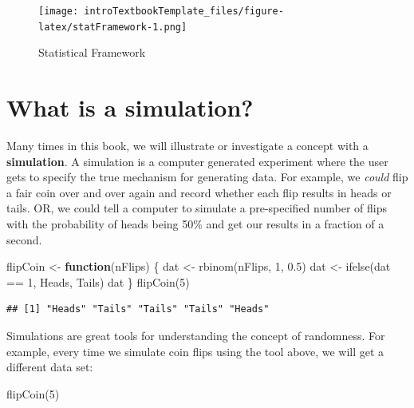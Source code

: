\documentclass[
]{book}
\newenvironment{Shaded}{\begin{snugshade}}{\end{snugshade}}
\newcommand{\ControlFlowTok}[1]{\textcolor[rgb]{0.13,0.29,0.53}{\textbf{#1}}}
\newcommand{\DecValTok}[1]{\textcolor[rgb]{0.00,0.00,0.81}{#1}}
\newcommand{\FloatTok}[1]{\textcolor[rgb]{0.00,0.00,0.81}{#1}}
\newcommand{\FunctionTok}[1]{\textcolor[rgb]{0.00,0.00,0.00}{#1}}
\newcommand{\NormalTok}[1]{#1}
\newcommand{\OtherTok}[1]{\textcolor[rgb]{0.56,0.35,0.01}{#1}}
\newcommand{\SpecialCharTok}[1]{\textcolor[rgb]{0.00,0.00,0.00}{#1}}
\newcommand{\StringTok}[1]{\textcolor[rgb]{0.31,0.60,0.02}{#1}}
\theoremstyle{definition}
\theoremstyle{definition}
\theoremstyle{definition}
\theoremstyle{remark}
\begin{document}
\begin{figure}
\centering
\texttt{[image: introTextbookTemplate\_files/figure-latex/statFramework-1.png]}
\caption{\label{fig:statFramework}Statistical Framework}
\end{figure}

\hypertarget{ch1_s5}{%
\section{What is a simulation?}\label{ch1_s5}}

Many times in this book, we will illustrate or investigate a concept with a \textbf{simulation}. A simulation is a computer generated experiment where the user gets to specify the true mechanism for generating data. For example, we \emph{could} flip a fair coin over and over again and record whether each flip results in heads or tails. OR, we could tell a computer to simulate a pre-specified number of flips with the probability of heads being 50\% and get our results in a fraction of a second.

\begin{Shaded}
\begin{Highlighting}[]
\NormalTok{flipCoin }\OtherTok{\textless{}{-}} \ControlFlowTok{function}\NormalTok{(nFlips) \{}
\NormalTok{    dat }\OtherTok{\textless{}{-}} \FunctionTok{rbinom}\NormalTok{(nFlips, }\DecValTok{1}\NormalTok{, }\FloatTok{0.5}\NormalTok{)}
\NormalTok{    dat }\OtherTok{\textless{}{-}} \FunctionTok{ifelse}\NormalTok{(dat }\SpecialCharTok{==} \DecValTok{1}\NormalTok{, }\StringTok{\textquotesingle{}Heads\textquotesingle{}}\NormalTok{, }\StringTok{\textquotesingle{}Tails\textquotesingle{}}\NormalTok{)}
\NormalTok{    dat}
\NormalTok{\}}
\FunctionTok{flipCoin}\NormalTok{(}\DecValTok{5}\NormalTok{)}
\end{Highlighting}
\end{Shaded}

\begin{verbatim}
## [1] "Heads" "Tails" "Tails" "Tails" "Heads"
\end{verbatim}

Simulations are great tools for understanding the concept of randomness. For example, every time we simulate coin flips using the tool above, we will get a different data set:

\begin{Shaded}
\begin{Highlighting}[]
\FunctionTok{flipCoin}\NormalTok{(}\DecValTok{5}\NormalTok{)}
\end{Highlighting}
\end{Shaded}
\end{document}
